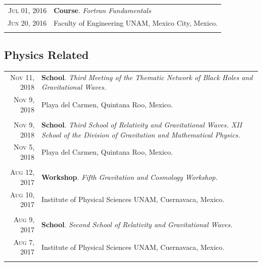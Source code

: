 \documentclass[a4paper,10pt]{article} %
\begin{document}
\begin{tabular}{r|p{11cm}}
	
	\textsc{Jul 01, 2016} & \small \textbf{Course}. \textit{Fortran Fundamentals}\\
	\textsc{Jun 20, 2016} & \small Faculty of Engineering UNAM, Mexico City, Mexico.\\
	\multicolumn{2}{c}{} \\
	
	
\end{tabular}

\subsection*{Physics Related}
\begin{tabular}{r|p{11cm}}
	
	\textsc{Nov 11, 2018} & \small \textbf{School}. \textit{Third Meeting of the Thematic Network of Black Holes and Gravitational Waves.}\\
	\textsc{Nov 9, 2018} &\small Playa del Carmen, Quintana Roo, Mexico.\\
	\multicolumn{2}{c}{} \\
	
	
	\textsc{Nov 9, 2018} & \small \textbf{School}. \textit{Third School of Relativity and Gravitational Waves. XII School of the Division of Gravitation and Mathematical Physics.}\\
	\textsc{Nov 5, 2018} &\small Playa del Carmen, Quintana Roo, Mexico.\\
	\multicolumn{2}{c}{} \\
	
	
	\textsc{Aug 12, 2017} & \small \textbf{Workshop}. \textit{Fifth Gravitation and Cosmology Workshop.}\\
	\textsc{Aug 10, 2017} & \small Institute of Physical Sciences UNAM, Cuernavaca, Mexico.\\
	\multicolumn{2}{c}{} \\
	
	
	\textsc{Aug 9, 2017} & \small \textbf{School}. \textit{Second School of Relativity and Gravitational Waves.}\\
	\textsc{Aug 7, 2017} & \small Institute of Physical Sciences UNAM, Cuernavaca, Mexico.\\
	\multicolumn{2}{c}{} \\
	

\end{tabular}
\end{document}

